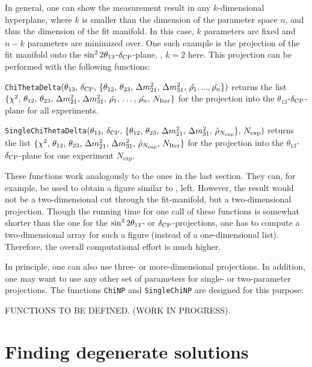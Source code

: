 In general, one can show the measurement result in any $k$-dimensional hyperplane, where $k$ is smaller than the dimension of the parameter space $n$, and thus the dimension of the fit manifold. In this case, $k$ parameters are fixed and $n-k$ parameters are minimized over. One such example is the projection of the fit manifold onto the $\sin^2 2 \theta_{13}$-$\delta_{\mathrm{CP}}$-plane, \ie, $k=2$ here. This projection can be performed with the following functions:
\begin{function}
{\tt ChiThetaDelta}$(\theta_{13}, \, \delta_{\mathrm{CP}}, \, \{ \theta_{12}, \, \theta_{23},  \, \Delta m_{21}^2 , \, \Delta m_{31}^2, \,   \hat{\rho_1}, ... , \hat{\rho_n} \})$ returns the list  $\{ \chi^2, \, \theta_{12}, \, \theta_{23}, \, \Delta m_{21}^2 , \, \Delta m_{31}^2,  \, \hat{\rho_1}, \, \hdots , \, \hat{\rho_n} , \, N_{\mathrm{Iter}} \}$ for the projection into the $\theta_{13}$-$\delta_{\mathrm{CP}}$-plane for all experiments.
\end{function}
\begin{function}
{\tt SingleChiThetaDelta}$( \theta_{13}, \, \delta_{\mathrm{CP}}, \, \{ \theta_{12}, \, \theta_{23}, \, \Delta m_{21}^2 , \, \Delta m_{31}^2, \,   \hat{\rho}_{N_{\mathrm{exp}}} \}, \, N_{\mathrm{exp}})$ returns the list $\{ \chi^2, \, \theta_{12}, \,   \theta_{23},  \, \Delta m_{21}^2 , \, \Delta m_{31}^2, \, \hat{\rho}_{N_{\mathrm{exp}}} ,  \, N_{\mathrm{Iter}} \}$ for the projection into the $\theta_{13}$-$\delta_{\mathrm{CP}}$-plane for one experiment $N_{\mathrm{exp}}$.
\end{function}
These functions work analogously to the ones in the last section. They can, for example, be used to obtain a figure similar to , left. However, the result would not be a two-dimensional cut through the fit-manifold, but a two-dimensional projection. Though the running time for one call of these functions is somewhat shorter than the one for the $\sin^2 2 \theta_{13}$- or $\delta_{\mathrm{CP}}$-projections, one has to compute a two-dimensional array for such a figure (instead of a one-dimensional list). Therefore, the overall computational effort is much higher.

In principle, one can also use three- or more-dimensional projections. In addition, one may want to use any other set of parameters for single- or two-parameter projections. The functions {\tt ChiNP} and {\tt SingleChiNP} are designed for this purpose:

FUNCTIONS TO BE DEFINED. (WORK IN PROGRESS).

\chapter{Finding degenerate solutions}

